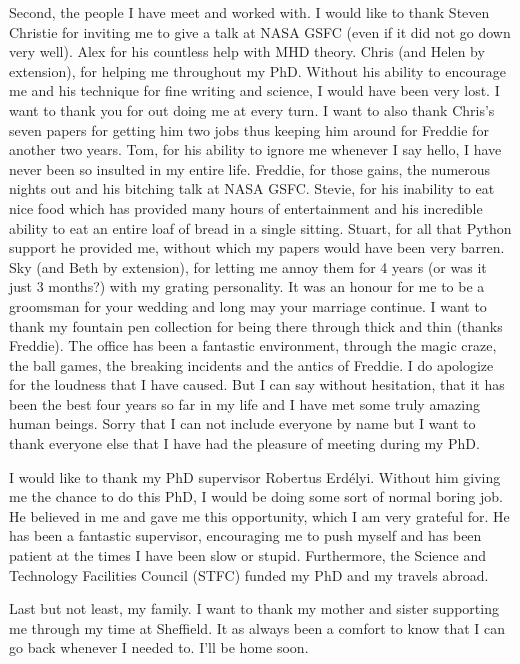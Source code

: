 \begin{acknowledgements}
    Second, the people I have meet and worked with.
    I would like to thank Steven Christie for inviting me to give a talk at NASA GSFC (even if it did not go down very well).
    Alex for his countless help with MHD theory.
    Chris (and Helen by extension), for helping me throughout my PhD.
    Without his ability to encourage me and his technique for fine writing and science, I would have been very lost.
    I want to thank you for out doing me at every turn.
    I want to also thank Chris's seven papers for getting him two jobs thus keeping him around for Freddie for another two years.
    Tom, for his ability to ignore me whenever I say hello, I have never been so insulted in my entire life.
    Freddie, for those gains, the numerous nights out and his bitching talk at NASA GSFC.
    Stevie, for his inability to eat nice food which has provided many hours of entertainment and his incredible ability to eat an entire loaf of bread in a single sitting. 
    Stuart, for all that Python support he provided me, without which my papers would have been very barren.
    Sky (and Beth by extension), for letting me annoy them for 4 years (or was it just 3 months?) with my grating personality.
    It was an honour for me to be a groomsman for your wedding and long may your marriage continue.
    I want to thank my fountain pen collection for being there through thick and thin (thanks Freddie).
    The office has been a fantastic environment, through the magic craze, the ball games, the breaking incidents and the antics of Freddie. 
    I do apologize for the loudness that I have caused.
    But I can say without hesitation, that it has been the best four years so far in my life and I have met some truly amazing human beings.
    Sorry that I can not include everyone by name but I want to thank everyone else that I have had the pleasure of meeting during my PhD.
        
    I would like to thank my PhD supervisor Robertus Erd\'elyi.
    Without him giving me the chance to do this PhD, I would be doing some sort of normal boring job.
    He believed in me and gave me this opportunity, which I am very grateful for.
    He has been a fantastic supervisor, encouraging me to push myself and has been patient at the times I have been slow or stupid.
    Furthermore, the Science and Technology Facilities Council (STFC) funded my PhD and my travels abroad.

    Last but not least, my family.
    I want to thank my mother and sister supporting me through my time at Sheffield.
    It as always been a comfort to know that I can go back whenever I needed to.
    I'll be home soon.
	
\end{acknowledgements}
